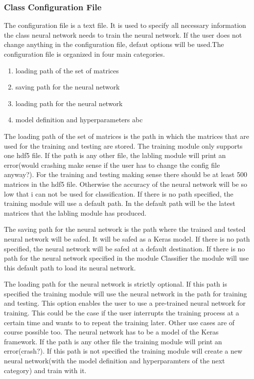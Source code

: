 \documentclass[parskip=full]{scrartcl}
\begin{document}
\subsubsection{Class Configuration File}
The configuration file is a text file.
It is used to specify all necessary information the class neural network needs to train the neural network.
If the user does not change anything in the configuration file, defaut options will be used.The configuration file is organized in four main categories. 
\begin{enumerate}
\item loading path of the set of matrices 
\item saving path for the neural network
\item loading path for the neural network
\item model definition and hyperparameters abc
\end{enumerate}
The loading path of the set of matrices is the path in which the matrices that are used for the training and testing are stored.
The training module only supports one hdf5 file.
If the path is any other file, the labling module will print an error(would crashing make sense if the user has to change the config file anyway?).
For the training and testing making sense there should be at least 500 matrices in the hdf5 file.
Otherwise the accuracy of the neural network will be so low that i can not be used for classification.
If there is no path specified, the training module will use a default path.
In the default path will be the latest matrices that the labling module has produced. \newline

The saving path for the neural network is the path where the trained and tested neural network will be safed.
It will be safed as a Keras model.
If there is no path specified, the neural network will be safed at a default destination.
If there is no path for the neural network specified in the module Classifier the module will use this default path to load its neural network.\newline

The loading path for the neural network is strictly optional.
If this path is specified the training module will use the neural network in the path for training and testing.
This option enables the user to use a pre-trained neural network for training.
This could be the case if the user interrupts the training process at a certain time and wants to to repeat the training later.
Other use cases are of course possible too.
The neural network has to be a model of the Keras framework. If the path is any other file the training module will print an error(crash?).
If this path is not specified the training module will create a new neural network(with the model definition and hyperparamters of the next category) and train with it. \newline
\end{document}
